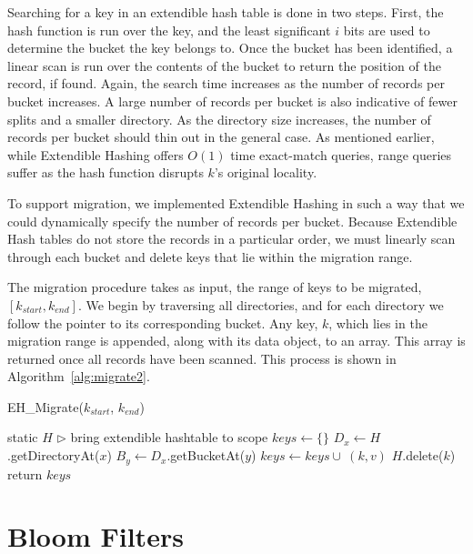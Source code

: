 Searching for a key in an extendible hash table is done in two steps. First,
the hash function is run over the key, and the least significant $i$ bits are
used to determine the bucket the key belongs to. Once the bucket has been
identified, a linear scan is run over the contents of the bucket to return the
position of the record, if found. Again, the search time increases as the
number of records per bucket increases. A large number of records per bucket is
also indicative of fewer splits and a smaller directory. As the directory size
increases, the number of records per bucket should thin out in the general
case. As mentioned earlier, while Extendible Hashing offers $O(1)$ time
exact-match queries, range queries suffer as the hash function disrupts $k$'s
original locality.

To support migration, we implemented Extendible Hashing in such a way that we
could dynamically specify the number of records per bucket. Because Extendible
Hash tables do not store the records in a particular order, we must linearly
scan through each bucket and delete keys that lie within the migration range.

The migration procedure takes as input, the range of keys to be migrated,
$[k_{start}, k_{end}]$. We begin by traversing all directories, and for each
directory we follow the pointer to its corresponding bucket. Any key, $k$, which
lies in the migration range is appended, along with its data object, to an
array. This array is returned once all records have been scanned. This
process is shown in Algorithm~\ref{alg:migrate2}.

\begin{algorithm}[htp]
\small
\caption{\label{alg:migrate2}EH\_Migrate($k_{start}$, $k_{end}$)} \begin{algorithmic}[1]
\STATE static $H$ $\triangleright$ bring extendible hashtable to scope
\STATE $keys \leftarrow \{\}$
  \STATE $D_x \leftarrow H$.getDirectoryAt($x$)
   \STATE $B_y \leftarrow D_x$.getBucketAt($y$)
       \STATE $keys \leftarrow keys \cup~(k,v)$
       \STATE $H$.delete($k$)
   \ENDFOR
 \ENDFOR
\ENDFOR
\STATE return $keys$
\end{algorithmic}
\end{algorithm}


\section{Bloom Filters} %
\label{sec:bloom_filters}

